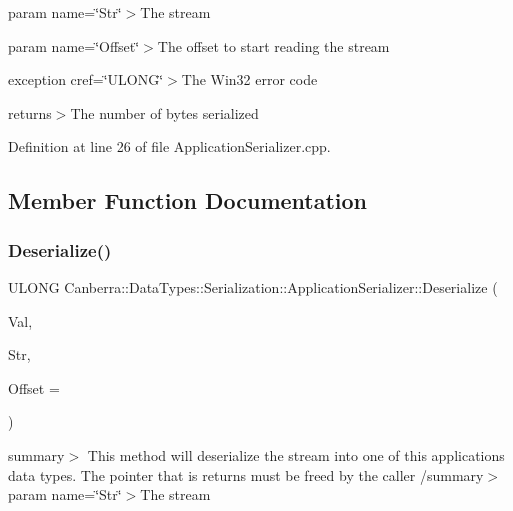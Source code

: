 param name=\char`\"{}\+Str\char`\"{}$>$The stream

param name=\char`\"{}\+Offset\char`\"{}$>$The offset to start reading the stream

exception cref=\char`\"{}\+U\+L\+O\+N\+G\char`\"{}$>$The Win32 error code

returns$>$The number of bytes serialized

Definition at line 26 of file Application\+Serializer.\+cpp.



\subsection{Member Function Documentation}
\mbox{\label{class_canberra_1_1_data_types_1_1_serialization_1_1_application_serializer_a5894cef5d85a2a5c6a766ce68e05640e_a5894cef5d85a2a5c6a766ce68e05640e}} 
\subsubsection{\texorpdfstring{Deserialize()}{Deserialize()}}
{\footnotesize\ttfamily U\+L\+O\+NG Canberra\+::\+Data\+Types\+::\+Serialization\+::\+Application\+Serializer\+::\+Deserialize (\begin{DoxyParamCaption}\item[{\hyperlink{class_canberra_1_1_serialization_1_1_serializable_object}{Canberra\+::\+Serialization\+::\+Serializable\+Object} \&}]{Val,  }\item[{\hyperlink{class_canberra_1_1_utility_1_1_core_1_1_byte_stream}{Canberra\+::\+Utility\+::\+Core\+::\+Byte\+Stream} \&}]{Str,  }\item[{const L\+O\+NG}]{Offset = {} }\end{DoxyParamCaption})}

summary$>$ This method will deserialize the stream into one of this applications data types. The pointer that is returns must be free\textquotesingle{}d by the caller /summary$>$ param name=\char`\"{}\+Str\char`\"{}$>$The stream

